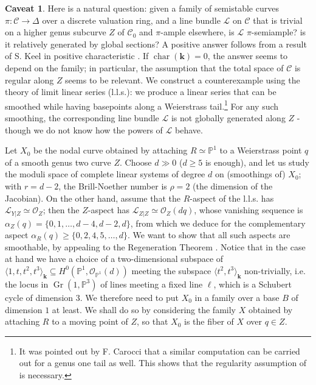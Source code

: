 \documentclass[11pt]{amsart}
\newcommand{\PP}{\mathbb P}
\renewcommand{\k}{\mathbf k}
\newcommand{\OO}{\mathcal O}
\renewcommand{\to}{\rightarrow}
\newcommand{\dvr}{\Delta}
\theoremstyle{plain}
\theoremstyle{definition}
\newtheorem*{caveat}{Caveat}
\begin{document}
\begin{caveat} Here is a natural question: given a family of semistable curves $\pi\colon\mathcal C\to\dvr$ over a discrete valuation ring, and a line bundle $\mathcal L$ on $\mathcal C$ that is trivial on a higher genus subcurve $Z$ of $\mathcal C_0$ and $\pi$-ample elsewhere, is $\mathcal L$ $\pi$-semiample? is it relatively generated by global sections? A positive answer follows from a result of S. Keel in positive characteristic \cite{Keel-bpf}. If $\operatorname{char}(\k)=0$, the answer seems to depend on the family; in particular, the assumption that the total space of $\mathcal C$ is regular along $Z$ seems to be relevant. We construct a counterexample using the theory of limit linear series (l.l.s.): we produce a linear series that can be smoothed while having basepoints along a Weierstrass tail.\footnote{It was pointed out by F. Carocci that a similar computation can be carried out for a genus one tail as well. This shows that the regularity assumption of \cite[Lemma 2.13]{SMY1} is necessary.} For any such smoothing, the corresponding line bundle $\mathcal L$ is not globally generated along $Z$ - though we do not know how the powers of $\mathcal L$ behave.
 
 Let $X_0$ be the nodal curve obtained by attaching $R\simeq\PP^1$ to a Weierstrass point $q$ of a smooth genus two curve $Z$. Choose $d\gg 0$ ($d\geq5$ is enough), and let us study the moduli space of complete linear systems of degree $d$ on (smoothings of) $X_0$; with $r=d-2$, the Brill-Noether number is $\rho=2$ (the dimension of the Jacobian). On the other hand, assume that the $R$-aspect of the l.l.s. has $\mathcal L_{Y|Z}\simeq\OO_Z$; then the $Z$-aspect has $\mathcal L_{Z|Z}\simeq\OO_Z(dq)$, whose vanishing sequence is $\alpha_Z(q)=\{0,1,\ldots,d-4,d-2,d\}$, from which we deduce for the complementary aspect $\alpha_R(q)\geq\{0,2,4,5,\ldots,d\}$. We want to show that all such aspects are smoothable, by appealing to the Regeneration Theorem \cite[Theorem 5.41]{HM}. Notice that in the case at hand we have a choice of a two-dimensional subspace of $\langle 1,t,t^2,t^3\rangle_\k\subseteq H^0(\PP^1,\OO_{\PP^1}(d))$ meeting the subspace $\langle t^2,t^3\rangle_\k$ non-trivially, i.e. the locus in $\operatorname{Gr}(1,\PP^3)$ of lines meeting a fixed line $\ell$, which is a Schubert cycle of dimension $3$. We therefore need to put $X_0$ in a family over a base $B$ of dimension $1$ at least.  We shall do so by considering the family $X$ obtained by attaching $R$ to a moving point of $Z$, so that $X_0$ is the fiber of $X$ over $q\in Z$.
 

\end{caveat}
\end{document}
